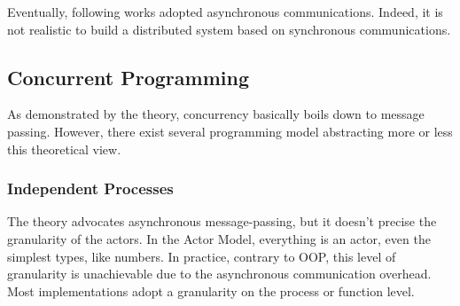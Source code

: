 Eventually, following works adopted asynchronous communications.
Indeed, it is not realistic to build a distributed system based on synchronous communications.














\subsection{Concurrent Programming}

As demonstrated by the theory, concurrency basically boils down to message passing.
However, there exist several programming model abstracting more or less this theoretical view.

\subsubsection{Independent Processes}

The theory advocates asynchronous message-passing, but it doesn't precise the granularity of the actors.
In the Actor Model, everything is an actor, even the simplest types, like numbers.
In practice, contrary to OOP, this level of granularity is unachievable due to the asynchronous communication overhead.
Most implementations adopt a granularity on the process or function level.

